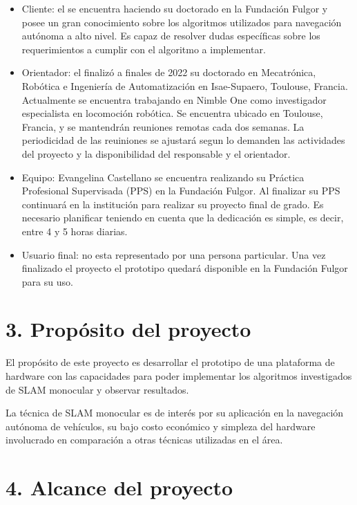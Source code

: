 \documentclass[
11pt, %
codirector, %
]{charter}
\begin{document}
\begin{itemize}
	\item Cliente: el \clientename{} se encuentra haciendo su doctorado en la Fundación Fulgor y posee un gran conocimiento sobre los algoritmos utilizados para navegación autónoma a alto nivel. Es capaz de resolver dudas específicas sobre los requerimientos a cumplir con el algoritmo a implementar.
	\item Orientador: el \supname{} finalizó a finales de 2022 su doctorado en Mecatrónica, Robótica e Ingeniería de Automatización en Isae-Supaero, Toulouse, Francia. Actualmente se encuentra trabajando en Nimble One como investigador especialista en locomoción robótica. Se encuentra ubicado en Toulouse, Francia, y se mantendrán reuniones remotas cada dos semanas. La periodicidad de las reuiniones se ajustará segun lo demanden las actividades del proyecto y la disponibilidad del responsable y el orientador.
	\item Equipo: Evangelina Castellano se encuentra realizando su Práctica Profesional Supervisada (PPS) en la Fundación Fulgor. Al finalizar su PPS continuará en la institución para realizar su proyecto final de grado. Es necesario planificar teniendo en cuenta que la dedicación es simple, es decir, entre 4 y 5 horas diarias.
	\item Usuario final: no esta representado por una persona particular. Una vez finalizado el proyecto el prototipo quedará disponible en la Fundación Fulgor para su uso.
\end{itemize}

\section{3. Propósito del proyecto}
\label{sec:proposito}

El propósito de este proyecto es desarrollar el prototipo de una plataforma de hardware con las capacidades para poder implementar los algoritmos investigados de SLAM monocular y observar resultados.

La técnica de SLAM monocular es de interés por su aplicación en la navegación autónoma de vehículos, su bajo costo económico y simpleza del hardware involucrado en comparación a otras técnicas utilizadas en el área.

\section{4. Alcance del proyecto}
\label{sec:alcance}
\end{document}
